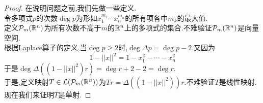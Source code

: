 \documentclass{ctexart}
\begin{document}
\begin{proof}
    在说明问题之前,我们先做一些定义.\\
    令多项式$p$的次数$\deg p$为形如$x_1^{m_1}\cdots x_n^{m_n}$的所有项各中$m_k$的最大值.\\
    定义$\mathcal{P}_m(\mathbb{R}^n)$为所有次数不高于$m$的$\mathbb{R}^n$上的多项式的集合.不难验证$\mathcal{P}_m(\mathbb{R}^n)$是向量空间.\\
    根据Laplace算子的定义,当$\deg p\geqslant 2$时,$\deg\Delta p=\deg p-2$.又因为
    \[1-||x||^2=1-x_1^2-\cdots-x_n^2\]
    于是$\deg\Delta\left(\left(1-||x||^2\right)r\right)=\deg r+2-2=\deg r$.\\
    于是,定义映射$T\in\mathcal{L}(\mathcal{P}_m(\mathbb{R}^n))$为$Tr=\Delta\left(\left(1-||x||^2\right)\right)r$.不难验证$T$是线性映射.\\
    现在我们来证明$T$是单射.
\end{proof}
\end{document}
